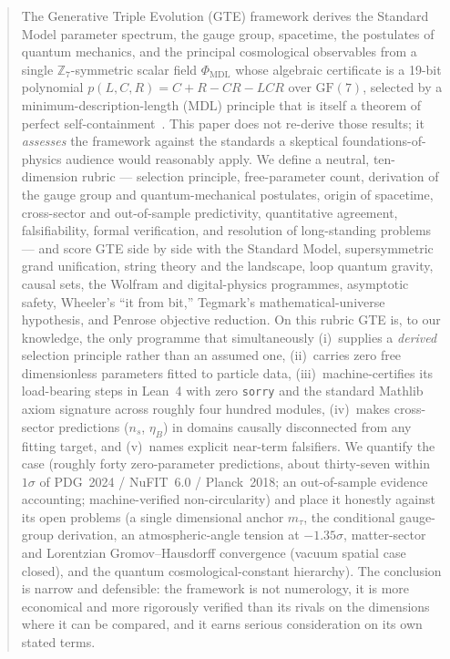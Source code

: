 \documentclass[11pt]{article}
\newcommand{\PHIMDL}{\ensuremath{\Phi_{\mathrm{MDL}}}}
\newcommand{\GF}[1]{\ensuremath{\mathrm{GF}(#1)}}
\newcommand{\poly}{\ensuremath{p(L,C,R)}}
\begin{document}
\begin{abstract}
The Generative Triple Evolution (GTE) framework derives the Standard Model
parameter spectrum, the gauge group, spacetime, the postulates of quantum
mechanics, and the principal cosmological observables from a single
$\mathbb{Z}_7$-symmetric scalar field $\PHIMDL$ whose algebraic certificate is a
19-bit polynomial $\poly = C+R-CR-LCR$ over $\GF{7}$, selected by a
minimum-description-length (MDL) principle that is itself a theorem of perfect
self-containment~\cite{SpivackGTECompleteFramework}.  This paper does not
re-derive those results; it \emph{assesses} the framework against the standards a
skeptical foundations-of-physics audience would reasonably apply.  We define a
neutral, ten-dimension rubric --- selection principle, free-parameter count,
derivation of the gauge group and quantum-mechanical postulates, origin of
spacetime, cross-sector and out-of-sample predictivity, quantitative agreement,
falsifiability, formal verification, and resolution of long-standing problems ---
and score GTE side by side with the Standard Model, supersymmetric grand
unification, string theory and the landscape, loop quantum gravity, causal sets,
the Wolfram and digital-physics programmes, asymptotic safety, Wheeler's
``it from bit,'' Tegmark's mathematical-universe hypothesis, and Penrose objective
reduction.  On this rubric GTE is, to our knowledge, the only programme that
simultaneously (i)~supplies a \emph{derived} selection principle rather than an
assumed one, (ii)~carries zero free dimensionless parameters fitted to particle
data, (iii)~machine-certifies its load-bearing steps in Lean~4 with zero
\texttt{sorry} and the standard Mathlib axiom signature across roughly four hundred
modules, (iv)~makes cross-sector predictions ($n_s$, $\eta_B$) in domains causally
disconnected from any fitting target, and (v)~names explicit near-term
falsifiers.  We quantify the case (roughly forty zero-parameter predictions,
about thirty-seven within $1\sigma$ of PDG~2024 / NuFIT~6.0 / Planck~2018; an
out-of-sample evidence accounting; machine-verified non-circularity) and place it
honestly against its open problems (a single dimensional anchor $m_\tau$, the
conditional gauge-group derivation, an atmospheric-angle tension at
$-1.35\sigma$, matter-sector and Lorentzian Gromov--Hausdorff convergence (vacuum spatial
case closed), and the quantum
cosmological-constant hierarchy).  The conclusion is narrow and defensible: the
framework is not numerology, it is more economical and more rigorously verified
than its rivals on the dimensions where it can be compared, and it earns serious
consideration on its own stated terms.
\end{abstract}
\end{document}
